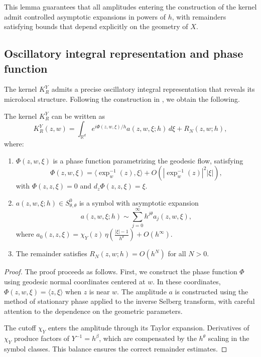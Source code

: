 This lemma guarantees that all amplitudes entering the construction of the kernel admit controlled asymptotic expansions in powers of $h$, with remainders satisfying bounds that depend explicitly on the geometry of $X$.

\subsection{Oscillatory integral representation and phase function}\label{subsec:micro-oscillatory}

The kernel $K_R^Y$ admits a precise oscillatory integral representation that reveals its microlocal structure. Following the construction in \cite{guillemin1973}, we obtain the following.

\begin{proposition}\label{prop:oscillatory-rep}
The kernel $K_R^Y$ can be written as
\[
K_R^Y(z,w) = \int_{\mathbb{R}^d} e^{i\Phi(z,w,\xi)/h} a(z,w,\xi;h)\, d\xi + R_N(z,w;h),
\]
where:
\begin{enumerate}
  \item $\Phi(z,w,\xi)$ is a phase function parametrizing the geodesic flow, satisfying
  \[
  \Phi(z,w,\xi) = \langle \exp_w^{-1}(z), \xi \rangle + O(|\exp_w^{-1}(z)|^2|\xi|),
  \]
  with $\Phi(z,z,\xi) = 0$ and $d_z\Phi(z,z,\xi) = \xi$.
  \item $a(z,w,\xi;h) \in S^0_{\theta,\theta}$ is a symbol with asymptotic expansion
  \[
  a(z,w,\xi;h) \sim \sum_{j=0}^\infty h^{j\theta} a_j(z,w,\xi),
  \]
  where $a_0(z,z,\xi) = \chi_Y(z)\,\eta\!\left(\frac{|\xi|-1}{h^\theta}\right) + O(h^\infty)$.
  \item The remainder satisfies $R_N(z,w;h) = O(h^N)$ for all $N > 0$.
\end{enumerate}
\end{proposition}

\begin{proof}
The proof proceeds as follows. First, we construct the phase function $\Phi$ using geodesic normal coordinates centered at $w$. In these coordinates, $\Phi(z,w,\xi) = \langle z,\xi \rangle$ when $z$ is near $w$. The amplitude $a$ is constructed using the method of stationary phase applied to the inverse Selberg transform, with careful attention to the dependence on the geometric parameters.

The cutoff $\chi_Y$ enters the amplitude through its Taylor expansion. Derivatives of $\chi_Y$ produce factors of $Y^{-1} = h^\beta$, which are compensated by the $h^\theta$ scaling in the symbol classes. This balance ensures the correct remainder estimates.
\end{proof}

